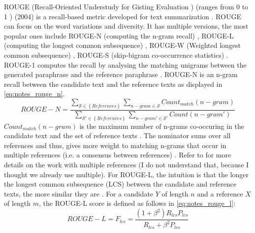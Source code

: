 ROUGE (Recall-Oriented Understudy for Gisting Evaluation \citep{palivela_optimization_2021,lin_rouge_2004}) 
(ranges from 0 to 1 \citep{kurt_pehlivanoglu_comparative_2024}) (2004) 
is a recall-based metric developed for text summarization \citep{zhou_paraphrase_2021,palivela_optimization_2021,kurt_pehlivanoglu_comparative_2024,lin_rouge_2004}.
ROUGE can focus on the word variations and diversity.
It has multiple versions, the most popular ones include 
ROUGE-N (computing the n-gram recall) \citep{zhou_paraphrase_2021,palivela_optimization_2021,kurt_pehlivanoglu_comparative_2024}, 
ROUGE-L (computing the longest common subsequence) \citep{zhou_paraphrase_2021,palivela_optimization_2021,kurt_pehlivanoglu_comparative_2024}, 
ROUGE-W (Weighted longest common subsequence) \citep{palivela_optimization_2021}, 
ROUGE-S (skip-bigram co-occurrence statistics) \citep{palivela_optimization_2021}.
ROUGE-1 computes the recall by analysing the matching unigrams between the generated paraphrase and the reference paraphrase \citep{palivela_optimization_2021,kurt_pehlivanoglu_comparative_2024}.
ROUGE-N is an n-gram recall between the candidate text and the reference texts \citep{lin_rouge_2004} as displayed in \autoref{eq:notes_rouge_n}.
\begin{equation}
    ROUGE-N = \frac{\sum_{\mathcal{S} \in \left\{ References \right\}}\sum_{n-gram \in\mathcal{S}}Count_{match}(n-gram)}{\sum_{\mathcal{S'} \in \left\{ References \right\}}\sum_{n-gram' \in\mathcal{S'}}Count(n-gram')}
\label{eq:notes_rouge_n}
\end{equation}
$Count_{match}(n-gram)$ is the maximum number of n-grams co-occuring in the candidate text and the set of reference texts \citep{lin_rouge_2004}.
The nominator sums over all references and thus, gives more weight to matching n-grams that occur in multiple references (i.e. a consensus between references) \citep{lin_rouge_2004}.
Refer to \citet{lin_rouge_2004} for more details on the work with multiple references (I do not understand that, because I thought we already use multiple).
For ROUGE-L, the intuition is that the longer the longest common subsequence (LCS) between the candidate and reference texts, the more similar they are \citep{lin_rouge_2004}.
For a candidate $Y$ of length $n$ and a reference $X$ of length $m$, the ROUGE-L score is defined as follows in \autoref{eq:notes_rouge_l}:
\begin{equation}
    ROUGE-L = F_{lcs} = \frac{(1 + \beta^2)R_{lcs}P_{lcs}}{R_{lcs} + \beta^2 P_{lcs}}
\label{eq:notes_rouge_l}
\end{equation}
